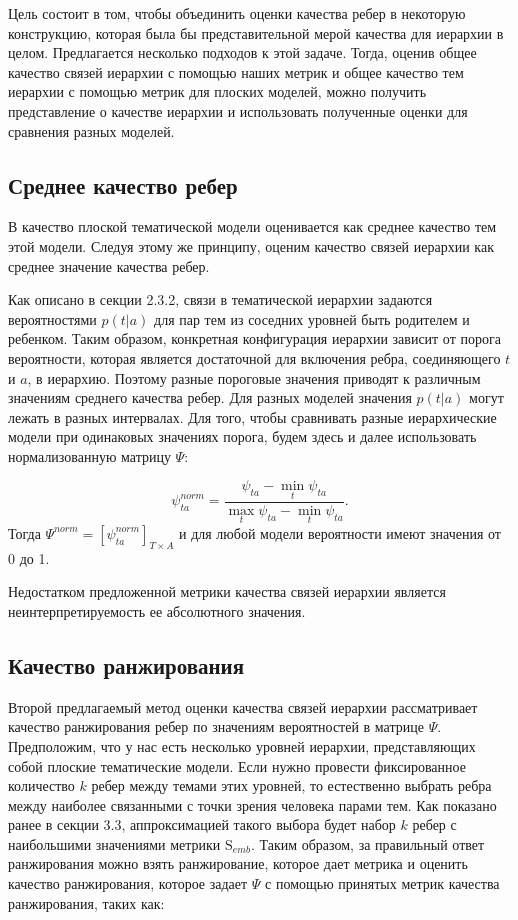 Цель состоит в том, чтобы объединить оценки качества ребер в некоторую конструкцию, которая была бы представительной мерой качества для иерархии в целом. Предлагается несколько подходов к этой задаче. Тогда, оценив общее качество связей иерархии с помощью наших метрик и общее качество тем иерархии с помощью метрик для плоских моделей, можно получить представление о качестве иерархии и использовать полученные оценки для сравнения разных моделей.

\subsection{Среднее качество ребер}
В \cite{Mimno2011} качество плоской тематической модели оценивается как среднее качество тем этой модели. Следуя этому же принципу, оценим качество связей иерархии как среднее значение качества ребер. 

Как описано в секции 2.3.2, связи в тематической иерархии задаются вероятностями $p(t|a)$ для пар тем из соседних уровней быть родителем и ребенком. Таким образом, конкретная конфигурация иерархии зависит от порога вероятности, которая является достаточной для включения ребра, соединяющего $t$ и $a$, в иерархию. Поэтому разные пороговые значения приводят к различным значениям среднего качества ребер. Для разных моделей значения $p(t|a)$ могут лежать в разных интервалах. Для того, чтобы сравнивать разные иерархические модели при одинаковых значениях порога, будем здесь и далее использовать нормализованную матрицу $\Psi$:

$$\psi_{ta}^{norm} = \dfrac{\psi_{ta} - \min_t \psi_{ta}}{\max_t \psi_{ta} - \min_t \psi_{ta}}.$$
Тогда $\Psi^{norm} = [\psi_{ta}^{norm}]_{T \times A}$ и для любой модели вероятности имеют значения от 0 до 1.

Недостатком предложенной метрики качества связей иерархии является неинтерпретируемость ее абсолютного значения.

\subsection{Качество ранжирования}

Второй предлагаемый метод оценки качества связей иерархии рассматривает качество ранжирования ребер по значениям вероятностей в матрице $\Psi$. Предположим, что у нас есть несколько уровней иерархии, представляющих собой плоские тематические модели. Если нужно провести фиксированное количество $k$ ребер между темами этих уровней, то естественно выбрать ребра между наиболее связанными с точки зрения человека парами тем. Как показано ранее в секции 3.3, аппроксимацией такого выбора будет набор $k$ ребер с наибольшими значениями метрики $\mathrm{S}_{emb}$. Таким образом, за правильный ответ ранжирования можно взять ранжирование, которое дает метрика и оценить качество ранжирования, которое задает $\Psi$ с помощью принятых метрик качества ранжирования, таких как:

